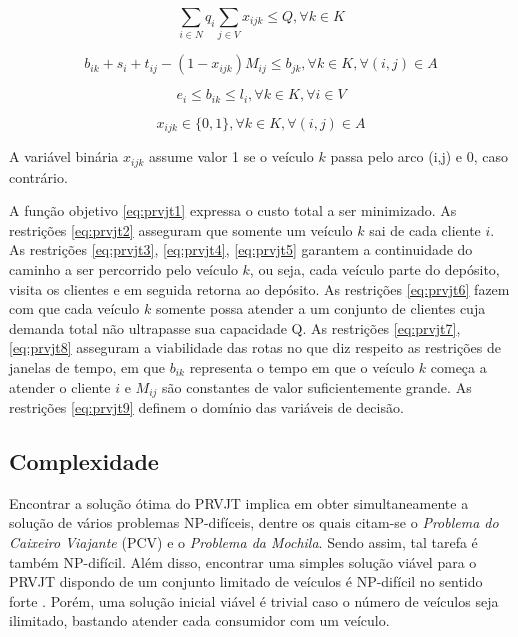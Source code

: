 \begin{equation} \label{eq:prvjt6}
\sum_{i \in N} q_i \sum_{j \in V} x_{ijk} \leq Q, \forall k \in K
\end{equation}

\begin{equation} \label{eq:prvjt7}
b_{ik} + s_i + t_{ij} -(1-x_{ijk})M_{ij} \leq b_{jk},\forall k \in K, \forall (i,j) \in A
\end{equation}

\begin{equation} \label{eq:prvjt8}
e_i \leq b_{ik} \leq l_i,\forall k \in K,\forall i \in V
\end{equation}

\begin{equation} \label{eq:prvjt9}
x_{ijk} \in \{0,1\},\forall k \in K,\forall (i,j) \in A
\end{equation}

A variável binária \(x_{ijk}\) assume valor 1 se o veículo \(k\) passa pelo arco (i,j) e 0, caso contrário.

A função objetivo \ref{eq:prvjt1} expressa o custo total a ser minimizado. 
As restrições \ref{eq:prvjt2} asseguram que somente um veículo \(k\) sai de cada cliente \(i\). 
As restrições \ref{eq:prvjt3}, \ref{eq:prvjt4}, \ref{eq:prvjt5} garantem a continuidade do caminho a ser percorrido pelo veículo \(k\), ou seja, cada veículo parte do depósito, visita os clientes e em seguida retorna ao depósito. 
As restrições \ref{eq:prvjt6} fazem com que cada veículo \(k\) somente possa atender a um conjunto de clientes cuja demanda total não ultrapasse sua capacidade Q. 
As restrições \ref{eq:prvjt7}, \ref{eq:prvjt8} asseguram a viabilidade das rotas no que diz respeito as restrições de janelas de tempo, em que \(b_{ik}\) representa o tempo em que o veículo \(k\) começa a atender o cliente \(i\) e \(M_{ij}\) são constantes de valor suficientemente grande.  As restrições \ref{eq:prvjt9} definem o domínio das variáveis de decisão.~\cite{CORDEAU}


\subsection{Complexidade}

Encontrar a solução ótima do PRVJT implica em obter simultaneamente a solução de vários problemas NP-difíceis, dentre os quais citam-se o \textit{Problema do Caixeiro Viajante} (PCV) e o \textit{Problema da Mochila}. Sendo assim, tal tarefa é também NP-difícil. Além disso, encontrar uma simples solução viável para o PRVJT dispondo de um conjunto limitado de veículos é NP-difícil no sentido forte \cite{Kohl}. Porém, uma solução inicial viável é trivial caso o número de veículos seja ilimitado, bastando atender cada consumidor com um veículo.

